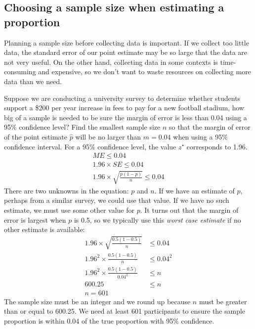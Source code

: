 \subsection{Choosing a sample size when estimating a proportion}


Planning a sample size before collecting data is important. If we collect too little data, the standard error of our point estimate may be so large that the data are not very useful. On the other hand, collecting data in some contexts is time-consuming and expensive, so we don't want to waste resources on collecting more data than we need.


\begin{example}{Suppose we are conducting a university survey to determine whether students support a \$200 per year increase in fees to pay for a new football stadium, how big of a sample is needed to be sure the margin of error is less than 0.04 using a 95\% confidence level? Find the smallest sample size $n$ so that the margin of error of the point estimate $\hat{p}$ will be no larger than $m=0.04$ when using a 95\% confidence interval.}
For a 95\% confidence level, the value $z^{\star}$ corresponds to 1.96. 
\begin{align*}
ME \leq 0.04 \\
1.96 \times SE \leq 0.04 \\
1.96\times \sqrt{\frac{p(1-p)}{n}} \leq 0.04
\end{align*}
There are two unknowns in the equation: $p$ and $n$. If we have an estimate of $p$, perhaps from a similar survey, we could use that value. If we have no such estimate, we must use some other value for $p$. It turns out that the margin of error is largest when $p$ is 0.5, so we typically use this \emph{worst case estimate} if no other estimate is available:
\begin{align*}
	1.96\times \sqrt{\frac{0.5(1-0.5)}{n}} &\leq 0.04 \\
	1.96^2\times \frac{0.5(1-0.5)}{n} &\leq 0.04^2 \\
	1.96^2\times \frac{0.5(1-0.5)}{0.04^2} &\leq n \\
	600.25 &\leq n \\
	n=601
\end{align*}
The sample size must be an integer and we round up because $n$ must be greater than or equal to 600.25. We need at least 601 participants to ensure the sample proportion is within 0.04 of the true proportion with 95\% confidence.
\end{example}

